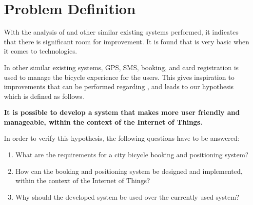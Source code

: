 \section{Problem Definition}
With the analysis of \bycykel and other similar existing systems performed, it indicates that there is significant room for improvement.
It is found that \bycykel is very basic when it comes to technologies.

In other similar existing systems, GPS, SMS, booking, and card registration is used to manage the bicycle experience for the users.
This gives inspiration to improvements that can be performed regarding \bycykelwithoutspace, and leads to our hypothesis which is defined as follows.

\begin{center}
\textbf{It is possible to develop a system that makes \bycykel more user friendly and manageable, within the context of the Internet of Things.}
\end{center}

In order to verify this hypothesis, the following questions have to be answered:

\begin{enumerate}
	\item What are the requirements for a city bicycle booking and positioning system?
	\item How can the booking and positioning system be designed and implemented, within the context of the Internet of Things?
	\item Why should the developed system be used over the currently used system?
\end{enumerate}